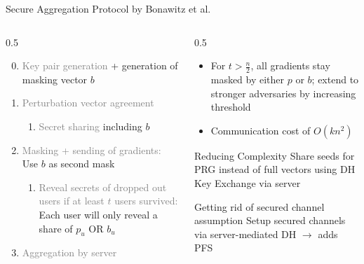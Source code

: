 \documentclass[t,aspectratio=169]{beamer}
\begin{document}
\begin{frame}{Secure Aggregation Protocol by Bonawitz et al. \cite{bonawitz2016practicalsecureaggregationfederated}}
    \begin{columns}
        \begin{column}{0.5\textwidth}
            \begin{enumerate}
            \setcounter{enumi}{-1}
                \item \textcolor{gray}{Key pair generation} + generation of masking vector $b$
                \item \textcolor{gray}{Perturbation vector agreement}
                \begin{enumerate}
                    \item \textcolor{gray}{Secret sharing} including $b$
                \end{enumerate}
                \item \textcolor{gray}{Masking + sending of gradients:} Use $b$ as second mask
                \begin{enumerate}
                    \item \textcolor{gray}{Reveal secrets of dropped out users if at least $t$ users survived:} Each user will only reveal a share of $p_u$ OR $b_u$
                \end{enumerate}
                \item \textcolor{gray}{Aggregation by server} 
                
            \end{enumerate}
        \end{column}
        \pause
        \begin{column}{0.5\textwidth}
            \begin{itemize}
                \item[\textbf{\textcolor{green}{+}}] For $t > \frac{n}{2}$, all gradients stay masked by either $p$ or $b$; extend to stronger adversaries by increasing threshold
                \pause
                \item[\textbf{\textcolor{red}{!}}] Communication cost of $O(kn^2)$
            \end{itemize}
            \pause
            \begin{alertblock}{Reducing Complexity}
                    Share seeds for PRG instead of full vectors using DH Key Exchange via server
            \end{alertblock}
            \pause
            \begin{alertblock}{Getting rid of secured channel assumption}
                Setup secured channels via server-mediated DH  $\rightarrow$ adds PFS
            \end{alertblock}
        \end{column}
    \end{columns}
\end{frame}
\end{document}
